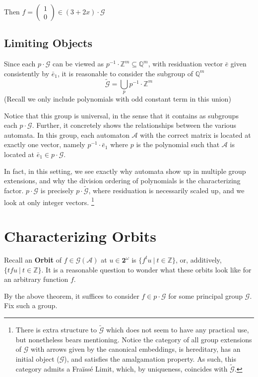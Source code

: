 \documentclass[12pt]{article}
\newcommand{\A}{\mathcal{A}}
\newcommand{\G}{\mathcal{G}}
\newcommand{\Z}{\mathbb{Z}}
\newcommand{\Q}{\mathbb{Q}}
\newcommand{\2}{\textbf{2}}
\newcommand{\e}{\bar{e}}
\begin{document}
Then $f = \begin{pmatrix} 1 \\ 0 \end{pmatrix} \in (3+2x) \cdot \G$

\subsection{Limiting Objects}
Since each $p \cdot \G$ can be viewed as $p^{-1} \cdot \Z^m \subseteq \Q^m$,
with residuation vector $\e$ given consistently by $\e_1$,
it is reasonable to consider the subgroup of $\Q^m$
\[ 
  \widetilde{\G} = \bigcup_p p^{-1} \cdot \Z^m 
\]
(Recall we only include polynomials with odd constant term in this union)

Notice that this group is universal, in the sense that it contains as
subgroups each $p \cdot \G$. Further, it concretely shows the relationships
between the various automata. In this group, each automaton $\A$ with
the correct matrix is located at exactly one vector, namely 
$p^{-1} \cdot \e_1$ where $p$ is the polynomial such that $\A$ is located
at $\e_1 \in p \cdot \G$.

In fact, in this setting, we see exactly why automata show up in multiple
group extensions, and why the division ordering of polynomials is the 
characterizing factor. $p \cdot \G$ is precisely $p \cdot \widetilde{\G}$, 
where residuation is necessarily scaled up, and we look at only integer
vectors.
\footnote
{%
  There is extra structure to $\widetilde{\G}$ which does not seem to
  have any practical use, but nonetheless bears mentioning.
  Notice the category of all group extensions of $\G$ with arrows given by the 
  canonical embeddings, is hereditary, has an initial object ($\G$), 
  and satisfies the amalgamation property. As such, this category admits a 
  Fra\"iss\'e Limit, which, by uniqueness, coincides with $\widetilde{\G}$.
}

\section{Characterizing Orbits}

Recall an \textbf{Orbit} of $f \in \G(\A)$ at $u \in \2^{\omega}$
is $\{ f^t u~|~t \in \Z \}$, or, additively, $\{ tf u~|~t \in \Z \}$.
It is a reasonable question to wonder what these orbits look like
for an arbitrary function $f$.

By the above theorem, it suffices to consider $f \in p \cdot \G$
for some principal group $\G$. Fix such a group.
\end{document}
